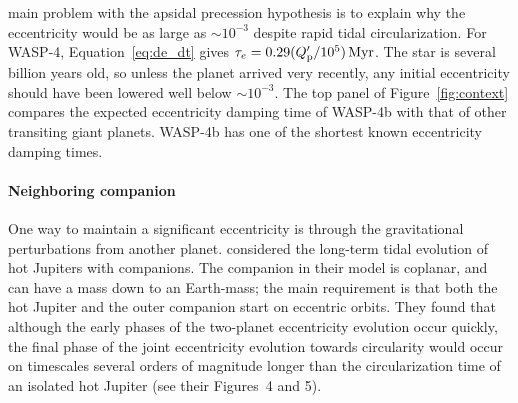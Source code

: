 \documentclass[12pt,twocolumn,tighten]{aastex62}
\begin{document}
 main problem with the apsidal precession
hypothesis is to explain why the
eccentricity would be as large as $\sim$$10^{-3}$ despite rapid tidal
circularization.  For WASP-4, Equation~\ref{eq:de_dt} gives $\tau_e =
0.29 (Q_{\rm p}'/10^5) \, {\rm Myr}$.  The star is several billion
years old, so unless the planet arrived very recently, any initial
eccentricity should have been lowered well below $\sim$$10^{-3}$.  The
top panel of Figure~\ref{fig:context} compares the expected
eccentricity damping time of WASP-4b with that of other transiting
giant planets.  WASP-4b has one of the shortest known eccentricity
damping times.

\paragraph{Neighboring companion}
One way to maintain a significant eccentricity is through the
gravitational perturbations from another planet.
\citet{mardling_long-term_2007} considered the long-term tidal
evolution of hot Jupiters with companions.  The companion in their
model is coplanar, and can have a mass down to an Earth-mass; the main
requirement is that both the hot Jupiter and the outer companion start
on eccentric orbits.  They found that although the early phases of the
two-planet eccentricity evolution occur quickly, the final phase of
the joint eccentricity evolution towards circularity would occur on
timescales several orders of magnitude longer than the circularization
time of an isolated hot Jupiter (see their Figures~4 and 5).
 
\end{document}

